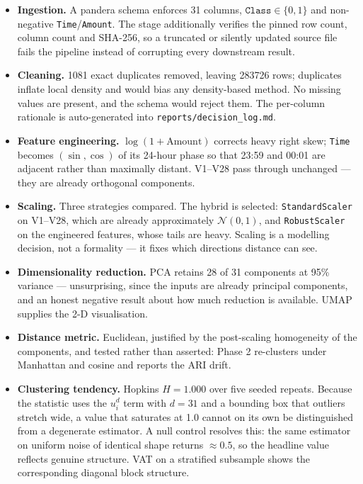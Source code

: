 \documentclass[11pt, a4paper]{article}
\providecommand{\num}[1]{#1}
\begin{document}
\begin{itemize}
  \item \textbf{Ingestion.} A pandera schema enforces 31 columns,
        $\texttt{Class} \in \{0,1\}$ and non-negative \texttt{Time}/\texttt{Amount}.
        The stage additionally verifies the pinned row count, column count and
        SHA-256, so a truncated or silently updated source file fails the
        pipeline instead of corrupting every downstream result.
  \item \textbf{Cleaning.} \num{1081} exact duplicates removed, leaving
        \num{283726} rows; duplicates inflate local density and would bias any
        density-based method. No missing values are present, and the schema
        would reject them. The per-column rationale is auto-generated into
        \texttt{reports/decision\_log.md}.
  \item \textbf{Feature engineering.} $\log(1+\text{Amount})$ corrects heavy
        right skew; \texttt{Time} becomes $(\sin, \cos)$ of its 24-hour phase so
        that 23:59 and 00:01 are adjacent rather than maximally distant. V1--V28
        pass through unchanged --- they are already orthogonal components.
  \item \textbf{Scaling.} Three strategies compared. The hybrid is selected:
        \texttt{StandardScaler} on V1--V28, which are already approximately
        $\mathcal{N}(0,1)$, and \texttt{RobustScaler} on the engineered features,
        whose tails are heavy. Scaling is a modelling decision, not a
        formality --- it fixes which directions distance can see.
  \item \textbf{Dimensionality reduction.} PCA retains 28 of 31 components at
        95\% variance --- unsurprising, since the inputs are already principal
        components, and an honest negative result about how much reduction is
        available. UMAP supplies the 2-D visualisation.
  \item \textbf{Distance metric.} Euclidean, justified by the post-scaling
        homogeneity of the components, and tested rather than asserted: Phase 2
        re-clusters under Manhattan and cosine and reports the ARI drift.
  \item \textbf{Clustering tendency.} Hopkins $H = 1.000$ over five seeded
        repeats. Because the statistic uses the $u_i^d$ term with $d = 31$ and a
        bounding box that outliers stretch wide, a value that saturates at 1.0
        cannot on its own be distinguished from a degenerate estimator. A null
        control resolves this: the same estimator on uniform noise of identical
        shape returns $\approx 0.5$, so the headline value reflects genuine
        structure. VAT on a stratified subsample shows the corresponding
        diagonal block structure.
\end{itemize}
\end{document}
